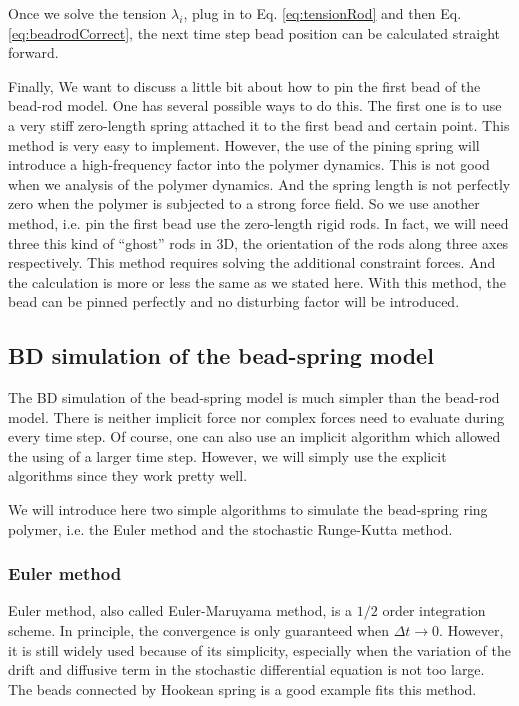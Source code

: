 Once we solve the tension $\lambda_i$, plug in to Eq. \eqref{eq:tensionRod} and then Eq. \eqref{eq:beadrodCorrect}, the next time step bead position can be calculated straight forward. 

Finally, We want to discuss a little bit about how to pin the first bead of the bead-rod model. One has several possible ways to do this. The first one is to use a very stiff zero-length spring attached it to the first bead and certain point. This method is very easy to implement. However, the use of the pining spring will introduce a high-frequency factor into the polymer dynamics. This is not good when we analysis of the polymer dynamics. And the spring length is not perfectly zero when the polymer is subjected to a strong force field. So we use another method, i.e. pin the first bead use the zero-length rigid rods. In fact, we will need three this kind of ``ghost'' rods in 3D, the orientation of the rods along three axes respectively. This method requires solving the additional constraint forces. And the calculation is more or less the same as we stated here. With this method, the bead can be pinned perfectly and no disturbing factor will be introduced. 

\subsection{BD simulation of the bead-spring model}
\label{sub:bd_of_bead_spring_model}

The BD simulation of the bead-spring model is much simpler than the bead-rod model. There is neither implicit force nor complex forces need to evaluate during every time step. Of course, one can also use an implicit algorithm which allowed the using of a larger time step. However, we will simply use the explicit algorithms since they work pretty well. 

We will introduce here two simple algorithms to simulate the bead-spring ring polymer, i.e. the Euler method and the stochastic Runge-Kutta method.

\subsubsection{Euler method}

Euler method, also called Euler-Maruyama method, is a 
$1/2$ order integration scheme. In principle, the convergence is only guaranteed when $\Delta t \rightarrow 0$. However, it is still widely used because of its simplicity, especially when the variation of the drift and diffusive term in the stochastic differential equation is not too large. The beads connected by Hookean spring is a good example fits this method. 

